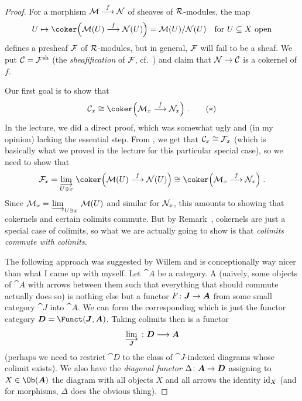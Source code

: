 \documentclass[a4paper,parskip=half,numbers=enddot, DIV=12]{scrreprt}
\begin{document}
\begin{proof}
	For a morphism $\Mm\morphism[f]\Nn$ of sheaves of $\mathcal{R}$-modules, the map 
	\begin{align*}
		U\mapsto \coker\Big(\Mm(U)\morphism[f]\Nn(U)\Big)=\Mm(U)/\Nn(U)\quad\text{for }U\subseteq X\text{ open}
	\end{align*}
	defines a presheaf $\mathcal{F}$ of $\mathcal{R}$-modules, but in general, $\mathcal{F}$ will fail to be a sheaf. We put $\mathcal{C}=\mathcal{F}^{\mathrm{sh}}$ (the \emph{sheafification} of $\mathcal{F}$, cf.\ \cite[Definition~1.2.3]{alggeo1}) and claim that $\Nn\morphism\Cc$ is a cokernel of $f$.
	
	Our first goal is to show that
	\begin{align}\lbl{eq:SheafCokernel}
		\Cc_x\cong\coker\Big(\Mm_x\morphism[f]\Nn_x\Big)\;.\tag{$*$}
	\end{align}
	In the lecture, we did a direct proof, which was somewhat ugly and (in my opinion) lacking the essential step. From \cite[Proposition~1.2.1]{alggeo1}, we get that $\mathcal{C}_x\cong\mathcal{F}_x$ (which is basically what we proved in the lecture for this particular special case), so we need to show that
	\begin{align*}
		\Ff_x=\colimit[U\ni x]\coker\Big(\Mm(U)\morphism[f]\Nn(U)\Big)\cong \coker\Big(\Mm_x\morphism[f]\Nn_x\Big)\;.
	\end{align*}
	Since $\Mm_x=\colimit[U\ni x]\Mm(U)$ and similar for $\mathcal{N}_x$, this amounts to showing that cokernels and certain colimits commute. But by Remark~, cokernels are just a special case of colimits, so what we are actually going to show is that \emph{colimits commute with colimits}.
	
	The following approach was suggested by Willem and is conceptionally way nicer than what I came up with myself. Let ${\cat A}$ be a category. A  (naively, some objects of ${\cat A}$ with arrows between them such that everything that should commute actually does so) is nothing else but a functor $F\colon \cat J\morphism{\cat A}$ from some small category $\cat J$ into ${\cat A}$. We can form the corresponding  which is just the functor category ${\cat D}=\Funct(\cat J,{\cat A})$. Taking colimits then is a functor 
	\begin{align*}
		\colimit[\cat J]\colon {\cat D}\morphism{\cat A}
	\end{align*}
	(perhaps we need to restrict ${\cat D}$ to the class of $\cat J$-indexed diagrams whose colimit exists). We also have the \emph{diagonal functor} $\Delta\colon{\cat A}\morphism{\cat D}$ assigning to $X\in\Ob({\cat A})$ the diagram with all objects $X$ and all arrows the identity $\operatorname{id}_X$ (and for morphisms, $\Delta$ does the obvious thing).
	

\end{proof}
\end{document}

